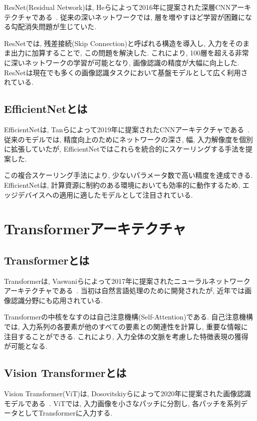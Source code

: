 ResNet(Residual Network)は, Heらによって2016年に提案された深層CNNアーキテクチャである~\cite{he2016deep}. 
従来の深いネットワークでは, 層を増やすほど学習が困難になる勾配消失問題が生じていた.

ResNetでは, 残差接続(Skip Connection)と呼ばれる構造を導入し, 入力をそのまま出力に加算することで, この問題を解決した. 
これにより, 100層を超える非常に深いネットワークの学習が可能となり, 画像認識の精度が大幅に向上した. 
ResNetは現在でも多くの画像認識タスクにおいて基盤モデルとして広く利用されている.

\subsection{EfficientNetとは}

EfficientNetは, Tanらによって2019年に提案されたCNNアーキテクチャである~\cite{tan2019efficientnet}. 
従来のモデルでは, 精度向上のためにネットワークの深さ, 幅, 入力解像度を個別に拡張していたが, EfficientNetではこれらを統合的にスケーリングする手法を提案した.

この複合スケーリング手法により, 少ないパラメータ数で高い精度を達成できる. 
EfficientNetは, 計算資源に制約のある環境においても効率的に動作するため, エッジデバイスへの適用に適したモデルとして注目されている.

\section{Transformerアーキテクチャ}

\subsection{Transformerとは}

Transformerは, Vaswaniらによって2017年に提案されたニューラルネットワークアーキテクチャである~\cite{vaswani2017attention}. 
当初は自然言語処理のために開発されたが, 近年では画像認識分野にも応用されている.

Transformerの中核をなすのは自己注意機構(Self-Attention)である. 
自己注意機構では, 入力系列の各要素が他のすべての要素との関連性を計算し, 重要な情報に注目することができる. 
これにより, 入力全体の文脈を考慮した特徴表現の獲得が可能となる.

\subsection{Vision Transformerとは}

Vision Transformer(ViT)は, Dosovitskiyらによって2020年に提案された画像認識モデルである~\cite{dosovitskiy2021image}. 
ViTでは, 入力画像を小さなパッチに分割し, 各パッチを系列データとしてTransformerに入力する.

